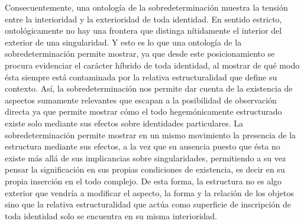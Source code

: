 Consecuentemente, una ontología de la sobredeterminación muestra la
tensión entre la interioridad y la exterioridad de toda identidad. En
sentido estricto, ontológicamente no hay una frontera que distinga
nítidamente el interior del exterior de una singularidad. Y esto es lo
que una ontología de la sobredeterminación permite mostrar, ya que desde
este posicionamiento se procura evidenciar el carácter híbrido de toda
identidad, al mostrar de qué modo ésta siempre está contaminada por la
relativa estructuralidad que define su contexto. Así, la
sobredeterminación nos permite dar cuenta de la existencia de aspectos
sumamente relevantes que escapan a la posibilidad de observación directa
ya que permite mostrar cómo el todo hegemónicamente estructurado existe
solo mediante sus efectos sobre identidades particulares. La
sobredeterminación permite mostrar en un mismo movimiento la presencia
de la estructura mediante sus efectos, a la vez que su ausencia puesto
que ésta no existe más allá de sus implicancias sobre singularidades,
permitiendo a su vez pensar la significación en sus propias condiciones
de existencia, es decir en su propia inserción en el todo complejo. De
esta forma, la estructura no es algo exterior que vendría a modificar el
aspecto, la forma y la relación de los objetos sino que la relativa
estructuralidad que actúa como superficie de inscripción de toda
identidad solo se encuentra en su misma interioridad.

